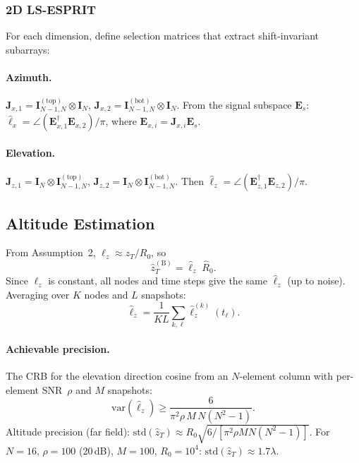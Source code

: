 \documentclass[11pt,a4paper]{article}
\begin{document}
\subsubsection{2D LS-ESPRIT}

For each dimension, define selection matrices that extract
shift-invariant subarrays:

\paragraph{Azimuth.}
$\mathbf{J}_{x,1}=\mathbf{I}_{N-1,N}^{(\mathrm{top})}\otimes
\mathbf{I}_N$,\;
$\mathbf{J}_{x,2}=\mathbf{I}_{N-1,N}^{(\mathrm{bot})}\otimes
\mathbf{I}_N$.
From the signal subspace $\mathbf{E}_s$:
$\hat{\ell}_x=\angle(\mathbf{E}_{x,1}^\dagger\mathbf{E}_{x,2})/\pi$,
where $\mathbf{E}_{x,i}=\mathbf{J}_{x,i}\mathbf{E}_s$.

\paragraph{Elevation.}
$\mathbf{J}_{z,1}=\mathbf{I}_N\otimes
\mathbf{I}_{N-1,N}^{(\mathrm{top})}$,\;
$\mathbf{J}_{z,2}=\mathbf{I}_N\otimes
\mathbf{I}_{N-1,N}^{(\mathrm{bot})}$.
Then
$\hat{\ell}_z=\angle(\mathbf{E}_{z,1}^\dagger\mathbf{E}_{z,2})/\pi$.

\subsection{Altitude Estimation}
\label{sec:altitude}

From Assumption~2, $\ell_z\approx z_T/R_0$, so
\begin{equation}
  \boxed{\hat{z}_T^{(\mathrm{B})}
  =\hat{\ell}_z\;\hat{R}_0.}
  \label{eq:zT_est}
\end{equation}
Since $\ell_z$ is constant, all nodes and time steps give the same
$\hat{\ell}_z$ (up to noise).  Averaging over $K$ nodes and $L$
snapshots:
\begin{equation}
  \hat{\ell}_z=\frac{1}{KL}\sum_{k,\ell}
  \hat{\ell}_z^{(k)}(t_\ell).
  \label{eq:lz_avg}
\end{equation}

\paragraph{Achievable precision.}
The CRB for the elevation direction cosine from an $N$-element
column with per-element SNR~$\rho$ and $M$ snapshots:
\begin{equation}
  \mathrm{var}(\hat{\ell}_z)\ge
  \frac{6}{\pi^2\rho\,M\,N(N^2{-}1)}.
  \label{eq:crb}
\end{equation}
Altitude precision (far field):
$\mathrm{std}(\hat{z}_T)\approx R_0
\sqrt{6/[\pi^2\rho MN(N^2{-}1)]}$.
For $N{=}16$, $\rho{=}100$ (20\,dB), $M{=}100$, $R_0{=}10^4$:
$\mathrm{std}(\hat{z}_T)\approx 1.7\lambda$.
\end{document}
